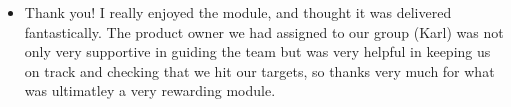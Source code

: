 \documentclass{scrreprt}
\begin{document}
\begin{itemize}
	\item Thank you! I really enjoyed the module, and thought it was delivered fantastically. The product owner we had assigned to our group (Karl) was not only very supportive in guiding the team but was very helpful in keeping us on track and checking that we hit our targets, so thanks very much for what was ultimatley a very rewarding module.
\end{itemize}
\end{document}
